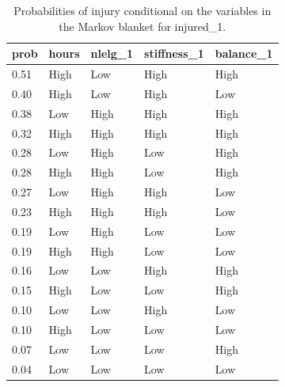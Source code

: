 \documentclass[
  english,
  man,floatsintext]{apa6}
\begin{document}
\begin{table}[H]

\begin{center}
\begin{threeparttable}

\caption{\label{tab:unnamed-chunk-8}Probabilities of injury conditional on the variables in the Markov blanket for injured\_1.}

\begin{tabular}{lllll}
\toprule
prob & \multicolumn{1}{c}{hours} & \multicolumn{1}{c}{nlelg\_1} & \multicolumn{1}{c}{stiffness\_1} & \multicolumn{1}{c}{balance\_1}\\
\midrule
0.51 & High & Low & High & High\\
0.40 & High & Low & High & Low\\
0.38 & Low & High & High & High\\
0.32 & High & High & High & High\\
0.28 & Low & High & Low & High\\
0.28 & High & High & Low & High\\
0.27 & Low & High & High & Low\\
0.23 & High & High & High & Low\\
0.19 & Low & High & Low & Low\\
0.19 & High & High & Low & Low\\
0.16 & Low & Low & High & High\\
0.15 & High & Low & Low & High\\
0.10 & Low & Low & High & Low\\
0.10 & High & Low & Low & Low\\
0.07 & Low & Low & Low & High\\
0.04 & Low & Low & Low & Low\\
\bottomrule
\end{tabular}

\end{threeparttable}
\end{center}

\end{table}
\end{document}
